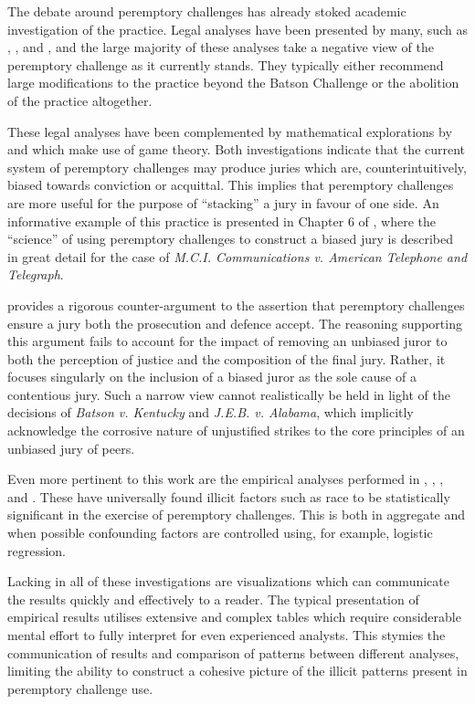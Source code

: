 The debate around peremptory challenges has already stoked academic investigation of the practice. Legal analyses have been
presented by many, such as \cite{hoffman1997}, \cite{broderick1992}, and \cite{Nunn1993}, and the large majority of these
analyses take a negative view of the peremptory challenge as it currently stands. They typically either recommend large
modifications to the practice beyond the Batson Challenge or the abolition of the practice altogether.

These legal analyses have been complemented by mathematical explorations by \cite{ford2010} and \cite{flanagan2015} which make use of game
theory. Both investigations indicate that the current system of peremptory challenges may produce juries which are, counterintuitively, biased
towards conviction or acquittal. This implies that peremptory challenges are more useful for the purpose of ``stacking'' a jury in favour of one side. An informative example of this practice is presented in  Chapter 6 of \cite{hansvidjudging}, where the ``science'' of using peremptory challenges to construct a biased jury is described in great detail for the case of \textit{M.C.I. Communications v. American Telephone and Telegraph}.

\cite{hoffman1997} provides a rigorous counter-argument to the assertion that peremptory challenges ensure a jury both the prosecution and defence accept. The reasoning supporting this argument fails to account for the
impact of removing an unbiased juror to both the perception of justice and the composition of the final jury. Rather, it focuses
singularly on the inclusion of a biased juror as the sole cause of a contentious jury. Such a narrow view cannot
realistically be held in light of the decisions of \textit{Batson v. Kentucky} and \textit{J.E.B. v. Alabama}, which implicitly
acknowledge the corrosive nature of unjustified strikes to the core principles of an unbiased jury of peers.

Even more pertinent to this work are the empirical analyses performed in \cite{PerempChalMurder}, \cite{JurySunshineProj},
\cite{StubbornLegacy}, and \cite{baldus2012}. These have
universally found illicit factors such as race to be statistically significant in
the exercise of peremptory challenges. This is both in aggregate and when possible confounding factors are controlled using, for example,
logistic regression. 

Lacking in all of these investigations are visualizations which can
communicate the results quickly and effectively to a reader. The typical presentation of empirical results utilises extensive and complex tables which require considerable mental effort to fully interpret for even experienced analysts. This stymies the communication of results and comparison of patterns between different analyses, limiting the ability to construct a cohesive picture of the illicit patterns present in peremptory challenge use.